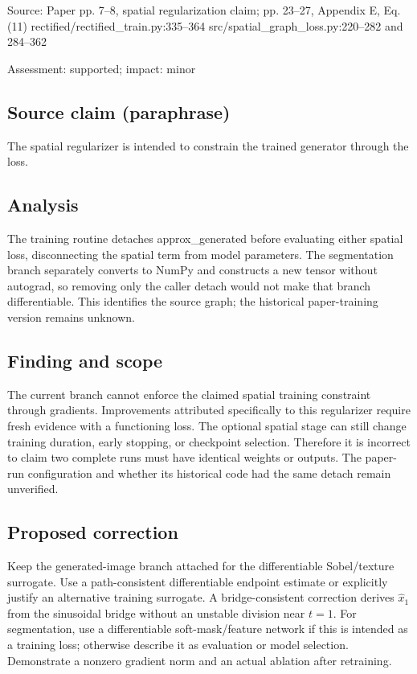 \documentclass[11pt]{article}
\begin{document}
Source: Paper pp. 7–8, spatial regularization claim; pp. 23–27, Appendix E, Eq. (11) rectified/rectified\_train.py:335–364 src/spatial\_graph\_loss.py:220–282 and 284–362

Assessment: supported; impact: minor

\subsection*{Source claim (paraphrase)}

The spatial regularizer is intended to constrain the trained generator through the loss.

\subsection*{Analysis}

The training routine detaches approx\_generated before evaluating either spatial loss, disconnecting the spatial term from model parameters. The segmentation branch separately converts to NumPy and constructs a new tensor without autograd, so removing only the caller detach would not make that branch differentiable. This identifies the source graph; the historical paper-training version remains unknown.

\subsection*{Finding and scope}

The current branch cannot enforce the claimed spatial training constraint through gradients. Improvements attributed specifically to this regularizer require fresh evidence with a functioning loss. The optional spatial stage can still change training duration, early stopping, or checkpoint selection. Therefore it is incorrect to claim two complete runs must have identical weights or outputs. The paper-run configuration and whether its historical code had the same detach remain unverified.

\subsection*{Proposed correction}

Keep the generated-image branch attached for the differentiable Sobel/texture surrogate. Use a path-consistent differentiable endpoint estimate or explicitly justify an alternative training surrogate. A bridge-consistent correction derives \(\widehat x_1\) from the sinusoidal bridge without an unstable division near \(t=1\). For segmentation, use a differentiable soft-mask/feature network if this is intended as a training loss; otherwise describe it as evaluation or model selection. Demonstrate a nonzero gradient norm and an actual ablation after retraining.
\end{document}
